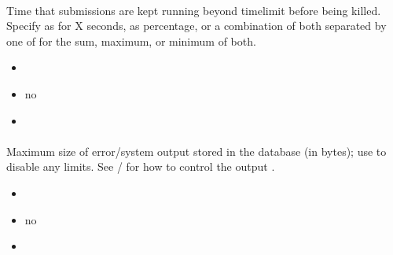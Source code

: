 \documentclass[a4paper,10pt,english,openany]{sphinxmanual}
\begin{document}
\paragraph{}
\label{\detokenize{configuration-reference:timelimit-overshoot}}
\sphinxAtStartPar
Time that submissions are kept running beyond timelimit before being killed. Specify as  for X seconds,  as percentage, or a combination of both separated by one of \sphinxtitleref{+|\&} for the sum, maximum, or minimum of both.
\begin{itemize}
\item {} 
\sphinxAtStartPar
{} 

\item {} 
\sphinxAtStartPar
{} no

\item {} 
\sphinxAtStartPar
{} 

\end{itemize}


\paragraph{}
\label{\detokenize{configuration-reference:output-storage-limit}}
\sphinxAtStartPar
Maximum size of error/system output stored in the database (in bytes); use  to disable any limits. See  /  for how to control the output .
\begin{itemize}
\item {} 
\sphinxAtStartPar
{} 

\item {} 
\sphinxAtStartPar
{} no

\item {} 
\sphinxAtStartPar
{} 

\end{itemize}
\end{document}
